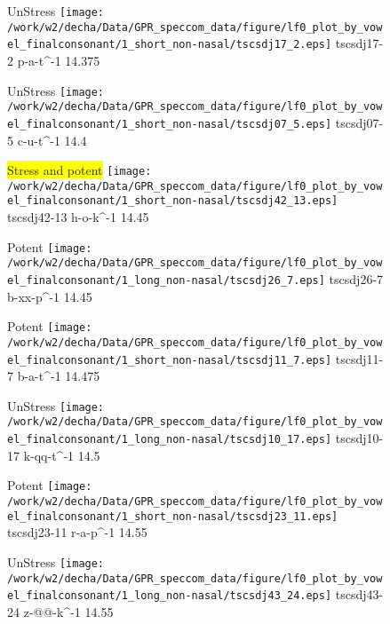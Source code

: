 \documentclass{article}
\begin{document}
\begin{figure}[t]
\begin{minipage}[b]{.24\textwidth}
UnStress
\centering
\texttt{[image: /work/w2/decha/Data/GPR\_speccom\_data/figure/lf0\_plot\_by\_vowel\_finalconsonant/1\_short\_non-nasal/tscsdj17\_2.eps]}
tscsdj17-2 p-a-t\textasciicircum-1 14.375
\end{minipage}
\begin{minipage}[b]{.24\textwidth}
UnStress
\centering
\texttt{[image: /work/w2/decha/Data/GPR\_speccom\_data/figure/lf0\_plot\_by\_vowel\_finalconsonant/1\_short\_non-nasal/tscsdj07\_5.eps]}
tscsdj07-5 c-u-t\textasciicircum-1 14.4
\end{minipage}
\begin{minipage}[b]{.24\textwidth}
\colorbox{yellow}{Stress and potent}
\centering
\texttt{[image: /work/w2/decha/Data/GPR\_speccom\_data/figure/lf0\_plot\_by\_vowel\_finalconsonant/1\_short\_non-nasal/tscsdj42\_13.eps]}
tscsdj42-13 h-o-k\textasciicircum-1 14.45
\end{minipage}
\begin{minipage}[b]{.24\textwidth}
\colorbox{Apricot}{Potent}
\centering
\texttt{[image: /work/w2/decha/Data/GPR\_speccom\_data/figure/lf0\_plot\_by\_vowel\_finalconsonant/1\_long\_non-nasal/tscsdj26\_7.eps]}
tscsdj26-7 b-xx-p\textasciicircum-1 14.45
\end{minipage}
\end{figure}

\begin{figure}[t]
\begin{minipage}[b]{.24\textwidth}
\colorbox{Apricot}{Potent}
\centering
\texttt{[image: /work/w2/decha/Data/GPR\_speccom\_data/figure/lf0\_plot\_by\_vowel\_finalconsonant/1\_short\_non-nasal/tscsdj11\_7.eps]}
tscsdj11-7 b-a-t\textasciicircum-1 14.475
\end{minipage}
\begin{minipage}[b]{.24\textwidth}
UnStress
\centering
\texttt{[image: /work/w2/decha/Data/GPR\_speccom\_data/figure/lf0\_plot\_by\_vowel\_finalconsonant/1\_long\_non-nasal/tscsdj10\_17.eps]}
tscsdj10-17 k-qq-t\textasciicircum-1 14.5
\end{minipage}
\begin{minipage}[b]{.24\textwidth}
\colorbox{Apricot}{Potent}
\centering
\texttt{[image: /work/w2/decha/Data/GPR\_speccom\_data/figure/lf0\_plot\_by\_vowel\_finalconsonant/1\_short\_non-nasal/tscsdj23\_11.eps]}
tscsdj23-11 r-a-p\textasciicircum-1 14.55
\end{minipage}
\begin{minipage}[b]{.24\textwidth}
UnStress
\centering
\texttt{[image: /work/w2/decha/Data/GPR\_speccom\_data/figure/lf0\_plot\_by\_vowel\_finalconsonant/1\_long\_non-nasal/tscsdj43\_24.eps]}
tscsdj43-24 z-@@-k\textasciicircum-1 14.55
\end{minipage}
\end{figure}
\end{document}
